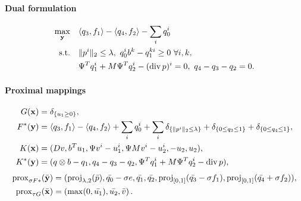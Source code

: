 \paragraph{Dual formulation}
\begin{align*}
    \max_{\mathbf{y}} \quad
        & \langle q_3, f_1 \rangle - \langle q_4, f_2 \rangle - \sum_i q_0^i  \\
    \text{s.t.}\quad
        & \|p^{i}\|_{2} \leq \lambda,
          ~q_0^i b^k - q_1^{ki} \geq 0 ~\forall i, k, \\
        & \Psi^T q_1^i + M \Psi^T q_2^i - (\operatorname{div} p)^i = 0,
          ~q_4 - q_3 - q_2 = 0.
\end{align*}

\paragraph{Proximal mappings}
\begin{align*}
    G(\mathbf{x}) &= \delta_{\{u_1 \geq 0\}}, \\
    F^*(\mathbf{y}) &= \langle q_3, f_1 \rangle - \langle q_4, f_2 \rangle
        + \sum_{i} q_0^i
        + \sum_{i} \delta_{\{\|p^{i}\|_{2} \leq \lambda\}}
        + \delta_{\{0 \leq q_3 \leq 1\}} + \delta_{\{0 \leq q_4 \leq 1\}}, \\
    K(\mathbf{x}) &= (
        Dv,
        b^T u_1,
        \Psi v^i - u_1^i,
        \Psi M v^i - u_2^i,
        -u_2,
        u_2
    ), \\
    K^*(\mathbf{y}) &= (
        q \otimes b - q_1,
        q_4 - q_3 - q_2,
        \Psi^T q_1^i + M \Psi^T q_2^i - \operatorname{div}{p}
    ),
\end{align*}
\begin{align*}
    \operatorname{prox}_{\sigma F*}(\bar{\mathbf{y}})
    &= (
        \operatorname{proj}_{\lambda,2}(\bar{p}),
        \bar{q_0}-\sigma e,
        \bar{q_1},
        \bar{q_2},
        \operatorname{proj}_{[0,1]}(\bar{q_3} - \sigma f_1),
        \operatorname{proj}_{[0,1]}(\bar{q_4} + \sigma f_2)
   ), \\
    \operatorname{prox}_{\tau G}(\bar{\mathbf{x}})
    &= \left(
        \max(0,\bar{u_1}),
        \bar{u_2},
        \bar{v}
    \right).
\end{align*}

